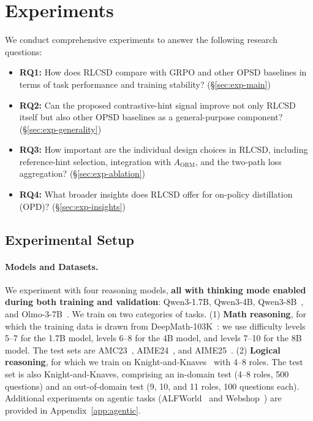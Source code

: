 \section{Experiments}
\label{sec:experiment}
We conduct comprehensive experiments to answer the following research questions:

\begin{itemize}[leftmargin=1.5em]
    \item \textbf{RQ1:} How does RLCSD compare with GRPO and other OPSD baselines in terms of task performance and training stability? (\S\ref{sec:exp-main})
    \item \textbf{RQ2:} Can the proposed contrastive-hint signal improve not only RLCSD itself but also other OPSD baselines as a general-purpose component? (\S\ref{sec:exp-generality})
    \item \textbf{RQ3:} How important are the individual design choices in RLCSD, including reference-hint selection, integration with $A_{\text{ORM}}$, and the two-path loss aggregation? (\S\ref{sec:exp-ablation})
    \item \textbf{RQ4:} What broader insights does RLCSD offer for on-policy distillation (OPD)? (\S\ref{sec:exp-insights})
\end{itemize}

\subsection{Experimental Setup}
\label{sec:exp-setup}

\paragraph{Models and Datasets.} We experiment with four reasoning models, \textbf{all with thinking mode enabled during both training and validation}: Qwen3-1.7B, Qwen3-4B, Qwen3-8B~\citep{yang2025qwen3}, and Olmo-3-7B~\citep{olmo2025olmo3}. We train on two categories of tasks. (1) \textbf{Math reasoning}, for which the training data is drawn from DeepMath-103K~\citep{he2025deepmath}: we use difficulty levels 5--7 for the 1.7B model, levels 6--8 for the 4B model, and levels 7--10 for the 8B model. The test sets are AMC23~\citep{amc23}, AIME24~\citep{aime24}, and AIME25~\citep{aime25}. (2) \textbf{Logical reasoning}, for which we train on Knight-and-Knaves~\citep{xie2025logic} with 4--8 roles. The test set is also Knight-and-Knaves, comprising an in-domain test (4--8 roles, 500 questions) and an out-of-domain test (9, 10, and 11 roles, 100 questions each). Additional experiments on agentic tasks (ALFWorld~\citep{shridhar2020alfworld} and Webshop~\citep{yao2022webshop}) are provided in Appendix~\ref{app:agentic}.

